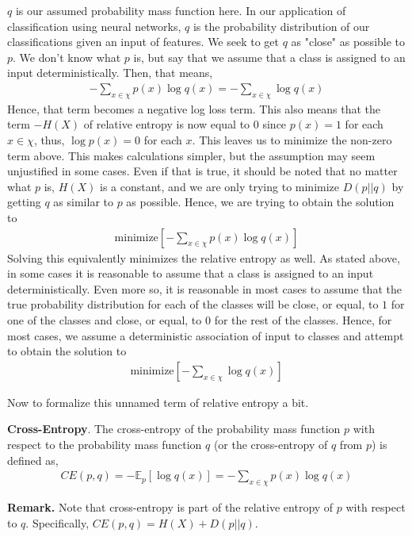 \documentclass[12pt]{article}
\theoremstyle{definition}
\numberwithin{equation}{section}
\newcommand{\E}{\ensuremath{\mathbb{E}}}
\begin{document}
$q$ is our assumed probability mass function here. In our application of classification using neural networks, $q$ is the probability distribution of our classifications given an input of features. We seek to get $q$ as "close" as possible to $p$. We don't know what $p$ is, but say that we assume that a class is assigned to an input deterministically. Then, that means,
\begin{gather*}
    -\sum_{x\in\chi} p(x)\log q(x) = -\sum_{x\in\chi}\log q(x)
\end{gather*}
Hence, that term becomes a negative log loss term. This also means that the term $-H(X)$ of relative entropy is now equal to $0$ since $p(x) = 1$ for each $x\in\chi$, thus, $\log p(x) = 0$ for each $x$. This leaves us to minimize the non-zero term above. This makes calculations simpler, but the assumption may seem unjustified in some cases. Even if that is true, it should be noted that no matter what $p$ is, $H(X)$ is a constant, and we are only trying to minimize $D(p||q)$ by getting $q$ as similar to $p$ as possible. Hence, we are trying to obtain the solution to
\begin{gather*}
    \text{minimize} [-\sum_{x\in\chi}p(x)\log q(x)]
\end{gather*}
Solving this equivalently minimizes the relative entropy as well. As stated above, in some cases it is reasonable to assume that a class is assigned to an input deterministically. Even more so, it is reasonable in most cases to assume that the true probability distribution for each of the classes will be close, or equal, to $1$ for one of the classes and close, or equal, to $0$ for the rest of the classes. Hence, for most cases, we assume a deterministic association of input to classes and attempt to obtain the solution to
\begin{gather*}
    \text{minimize} [-\sum_{x\in\chi}\log q(x)]
\end{gather*}

Now to formalize this unnamed term of relative entropy a bit.

 \textbf{Cross-Entropy}. The cross-entropy of the probability mass function $p$ with respect to the probability mass function $q$ (or the cross-entropy of $q$ from $p$) is defined as,
\begin{gather*}
    CE(p, q) = -\E_p[\log q(x)] = -\sum_{x\in\chi}p(x)\log q(x)
\end{gather*}

\textbf{Remark.} Note that cross-entropy is part of the relative entropy of $p$ with respect to $q$. Specifically, $CE(p, q) = H(X) + D(p||q)$.
\end{document}
